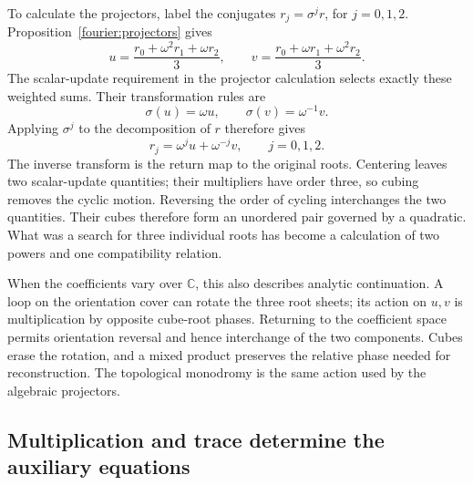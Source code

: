 \documentclass[11pt]{article}
\theoremstyle{remark}
\newcommand{\C}{\mathbb C}
\begin{document}
To calculate the projectors, label the conjugates \(r_j=\sigma^j r\), for \(j=0,1,2\). Proposition~\ref{fourier:projectors} gives
\begin{equation}
u=\frac{r_0+\omega^2r_1+\omega r_2}{3},
\qquad
v=\frac{r_0+\omega r_1+\omega^2r_2}{3}.
\label{eq:cubic-fourier}
\end{equation}
The scalar-update requirement in the projector calculation selects exactly these weighted sums. Their transformation rules are
\[
\sigma(u)=\omega u,\qquad \sigma(v)=\omega^{-1}v.
\]
Applying \(\sigma^j\) to the decomposition of \(r\) therefore gives
\begin{equation}
r_j=\omega^ju+\omega^{-j}v,\qquad j=0,1,2.
\label{eq:cubic-inversion}
\end{equation}
The inverse transform is the return map to the original roots. Centering leaves two scalar-update quantities; their multipliers have order three, so cubing removes the cyclic motion. Reversing the order of cycling interchanges the two quantities. Their cubes therefore form an unordered pair governed by a quadratic. What was a search for three individual roots has become a calculation of two powers and one compatibility relation.

When the coefficients vary over \(\C\), this also describes analytic continuation. A loop on the orientation cover can rotate the three root sheets; its action on \(u,v\) is multiplication by opposite cube-root phases. Returning to the coefficient space permits orientation reversal and hence interchange of the two components. Cubes erase the rotation, and a mixed product preserves the relative phase needed for reconstruction. The topological monodromy is the same action used by the algebraic projectors.

\subsection{Multiplication and trace determine the auxiliary equations}
\end{document}
